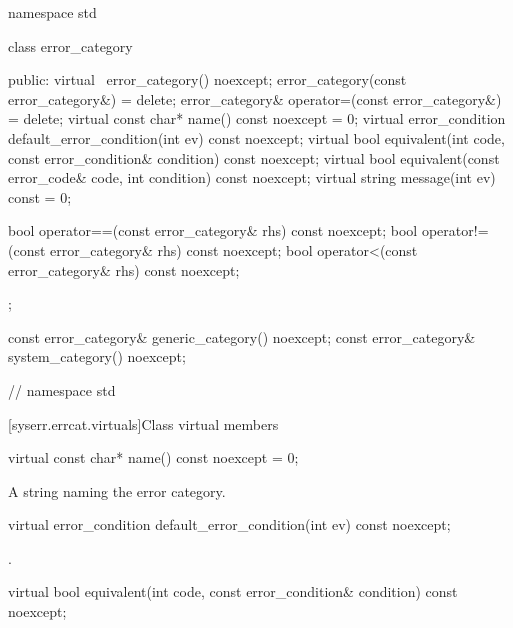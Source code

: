 %
%
%
\begin{codeblock}
namespace std {
  class error_category {
  public:
    virtual ~error_category() noexcept;
    error_category(const error_category&) = delete;
    error_category& operator=(const error_category&) = delete;
    virtual const char* name() const noexcept = 0;
    virtual error_condition default_error_condition(int ev) const noexcept;
    virtual bool equivalent(int code, const error_condition& condition) const noexcept;
    virtual bool equivalent(const error_code& code, int condition) const noexcept;
    virtual string message(int ev) const = 0;
    
    bool operator==(const error_category& rhs) const noexcept;
    bool operator!=(const error_category& rhs) const noexcept;
    bool operator<(const error_category& rhs) const noexcept;
  };

  const error_category& generic_category() noexcept;
  const error_category& system_category() noexcept;

}   // namespace std
\end{codeblock}

[syserr.errcat.virtuals]{Class  virtual members}

\begin{itemdecl}
virtual const char* name() const noexcept = 0;
\end{itemdecl}

\begin{itemdescr}
\pnum
\returns A string naming the error category.
\end{itemdescr}

\begin{itemdecl}
virtual error_condition default_error_condition(int ev) const noexcept;
\end{itemdecl}

\begin{itemdescr}
\pnum
\returns
{}.
\end{itemdescr}

\begin{itemdecl}
virtual bool equivalent(int code, const error_condition& condition) const noexcept;
\end{itemdecl}

